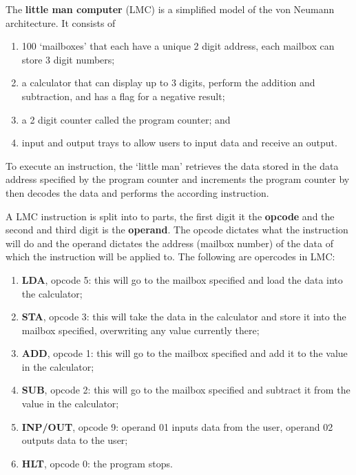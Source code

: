 \begin{definition}
    The \textbf{little man computer} (LMC) is a simplified model of the von Neumann architecture. It consists of
    \begin{enumerate}
        \item 100 `mailboxes' that each have a unique 2 digit address, each mailbox can store 3 digit numbers;
        \item a calculator that can display up to 3 digits, perform the addition and subtraction, and has a flag for a negative result;
        \item a 2 digit counter called the program counter; and
        \item input and output trays to allow users to input data and receive an output.
    \end{enumerate} 
    To execute an instruction, the `little man' retrieves the data stored in the data address specified by the program counter and increments the program counter by then decodes the data and performs the according instruction.
\end{definition}

\begin{definition}
    A LMC instruction is split into to parts, the first digit it the \textbf{opcode} and the second and third digit is the \textbf{operand}. The opcode dictates what the instruction will do and the operand dictates the address (mailbox number) of the data of which the instruction will be applied to. The following are opercodes in LMC:
    \begin{enumerate}
        \item \textbf{LDA}, opcode 5: this will go to the mailbox specified and load the data into the calculator;
        \item \textbf{STA}, opcode 3: this will take the data in the calculator and store it into the mailbox specified, overwriting any value currently there;
        \item \textbf{ADD}, opcode 1: this will go to the mailbox specified and add it to the value in the calculator;
        \item \textbf{SUB}, opcode 2: this will go to the mailbox specified and subtract it from the value in the calculator;
        \item \textbf{INP/OUT}, opcode 9: operand 01 inputs data from the user, operand 02 outputs data to the user;
        \item \textbf{HLT}, opcode 0: the program stops.
    \end{enumerate}
\end{definition}

